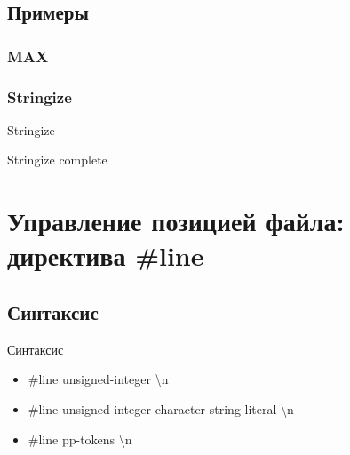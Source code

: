     \subsection{Примеры}
    \subsubsection{MAX}
    \begin{frame}
        
    \end{frame}
    \begin{frame}
        
    \end{frame}
    \begin{frame}
        
    \end{frame}
    \begin{frame}
        
    \end{frame}
    \begin{frame}
        
    \end{frame}
    \subsubsection{Stringize}
    \begin{frame}{Stringize}
        
    \end{frame}
    \begin{frame}{Stringize complete}
        
    \end{frame}

    \section{Управление позицией файла: директива \#line}
    \subsection{Синтаксис}
    \begin{frame}{Синтаксис}
        \begin{itemize}
            \item \#line unsigned-integer \textbackslash{n}
            \item \#line unsigned-integer character-string-literal \textbackslash{n}
            \item \#line pp-tokens \textbackslash{n}
        \end{itemize}
    \end{frame}
